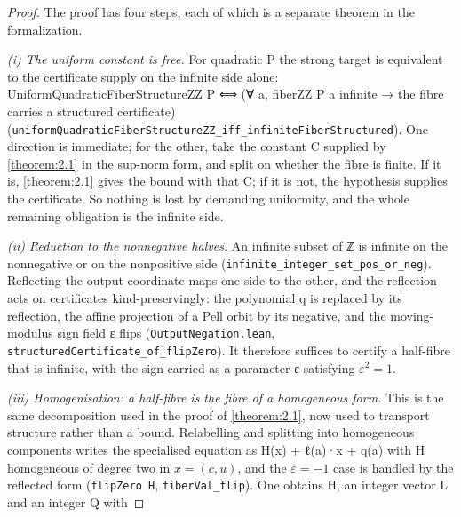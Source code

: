 \begin{proof}
The proof has four steps, each of which is a separate theorem in the formalization.

\emph{(i) The uniform constant is free.} For quadratic P the strong target is equivalent to the certificate supply on the infinite side alone: UniformQuadraticFiberStructureZZ P ⟺ (∀ a, fiberZZ P a infinite → the fibre carries a structured certificate) (\texttt{uniformQuadraticFiberStructureZZ\_\allowbreak{}iff\_\allowbreak{}infiniteFiberStructured}). One direction is immediate; for the other, take the constant C supplied by \cref{theorem:2.1} in the sup-norm form, and split on whether the fibre is finite. If it is, \cref{theorem:2.1} gives the bound with that C; if it is not, the hypothesis supplies the certificate. So nothing is lost by demanding uniformity, and the whole remaining obligation is the infinite side.

\emph{(ii) Reduction to the nonnegative halves.} An infinite subset of ℤ is infinite on the nonnegative or on the nonpositive side (\texttt{infinite\_\allowbreak{}integer\_\allowbreak{}set\_\allowbreak{}pos\_\allowbreak{}or\_\allowbreak{}neg}). Reflecting the output coordinate maps one side to the other, and the reflection acts on certificates kind-preservingly: the polynomial q is replaced by its reflection, the affine projection of a Pell orbit by its negative, and the moving-modulus sign field ε flips (\texttt{OutputNegation.\allowbreak{}lean}, \texttt{structuredCertificate\_\allowbreak{}of\_\allowbreak{}flipZero}). It therefore suffices to certify a half-fibre that is infinite, with the sign carried as a parameter ε satisfying $ε^{2} = 1$.

\emph{(iii) Homogenisation: a half-fibre is the fibre of a homogeneous form.} This is the same decomposition used in the proof of \cref{theorem:2.1}, now used to transport structure rather than a bound. Relabelling and splitting into homogeneous components writes the specialised equation as H(x) + ℓ(a)·x + q(a) with H homogeneous of degree two in $x = (c, u)$, and the $ε = −1$ case is handled by the reflected form (\texttt{flipZero H}, \texttt{fiberVal\_\allowbreak{}flip}). One obtains H, an integer vector L and an integer Q with


\end{proof}
